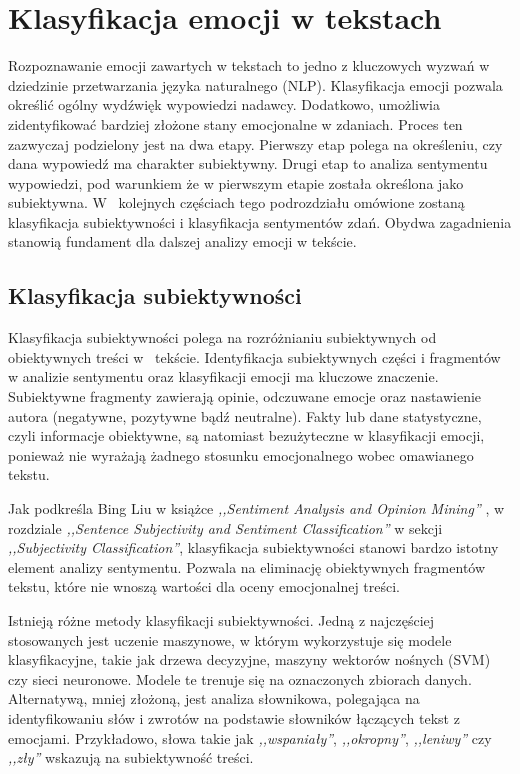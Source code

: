\documentclass[wmii, inf, mgr]{uwmthesis}
\begin{document}
\section{Klasyfikacja emocji w tekstach}
Rozpoznawanie emocji zawartych w tekstach to jedno z kluczowych wyzwań w dziedzinie przetwarzania języka naturalnego (NLP). Klasyfikacja emocji pozwala określić ogólny wydźwięk wypowiedzi nadawcy. Dodatkowo, umożliwia zidentyfikować bardziej złożone stany emocjonalne w zdaniach. Proces ten zazwyczaj podzielony jest na dwa etapy. Pierwszy etap polega na określeniu, czy dana wypowiedź ma charakter subiektywny. Drugi etap to analiza sentymentu wypowiedzi, pod warunkiem że w pierwszym etapie została określona jako subiektywna. W~ kolejnych częściach tego podrozdziału omówione zostaną klasyfikacja subiektywności i klasyfikacja sentymentów zdań. Obydwa zagadnienia stanowią fundament dla dalszej analizy emocji w tekście.

\subsection{Klasyfikacja subiektywności}
Klasyfikacja subiektywności polega na rozróżnianiu subiektywnych od obiektywnych treści w~ tekście. Identyfikacja subiektywnych części i fragmentów w analizie sentymentu oraz klasyfikacji emocji ma kluczowe znaczenie. Subiektywne fragmenty zawierają opinie, odczuwane emocje oraz nastawienie autora (negatywne, pozytywne bądź neutralne). Fakty lub dane statystyczne, czyli informacje obiektywne, są natomiast bezużyteczne w klasyfikacji emocji, ponieważ nie wyrażają żadnego stosunku emocjonalnego wobec omawianego tekstu.

Jak podkreśla Bing Liu w książce \textit{,,Sentiment Analysis and Opinion Mining''} \cite{SentimentAnalysisandOpinionMining}, w rozdziale \textit{,,Sentence Subjectivity and Sentiment Classification''} w sekcji \textit{,,Subjectivity Classification''}, klasyfikacja subiektywności stanowi bardzo istotny element analizy sentymentu. Pozwala na eliminację obiektywnych fragmentów tekstu, które nie wnoszą wartości dla oceny emocjonalnej treści.

Istnieją różne metody klasyfikacji subiektywności. Jedną z najczęściej stosowanych jest uczenie maszynowe, w którym wykorzystuje się modele klasyfikacyjne, takie jak drzewa decyzyjne, maszyny wektorów nośnych (SVM) czy sieci neuronowe. Modele te trenuje się na oznaczonych zbiorach danych. Alternatywą, mniej złożoną, jest analiza słownikowa, polegająca na identyfikowaniu słów i zwrotów na podstawie słowników łączących tekst z emocjami. Przykładowo, słowa takie jak \textit{,,wspaniały''}, \textit{,,okropny''}, \textit{,,leniwy''} czy \textit{,,zły''} wskazują na subiektywność treści.
\end{document}
